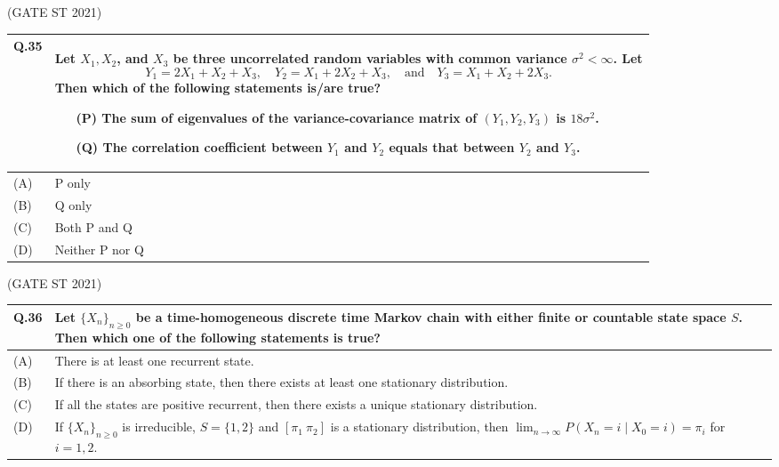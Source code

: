 \documentclass[journal,12pt,onecolumn]{IEEEtran}
\theoremstyle{remark}
\begin{document}
\bigskip
\hfill (GATE ST 2021)
\\
\begin{tabular}{|p{1cm}|p{14cm}|}
\hline
\textbf{Q.35} &
Let $X_1, X_2$, and $X_3$ be three uncorrelated random variables with common variance $\sigma^2 < \infty$. Let
$$
Y_1 = 2X_1 + X_2 + X_3, \quad Y_2 = X_1 + 2X_2 + X_3, \quad \text{and} \quad Y_3 = X_1 + X_2 + 2X_3.
$$
Then which of the following statements is/are true?

\begin{itemize}
\item[(P)] The sum of eigenvalues of the variance-covariance matrix of $(Y_1, Y_2, Y_3)$ is $18 \sigma^2$.
\item[(Q)] The correlation coefficient between $Y_1$ and $Y_2$ equals that between $Y_2$ and $Y_3$.
\end{itemize}\\
\hline

(A) & P only\\
\hline
(B) & Q only\\
\hline
(C) & Both P and Q\\
\hline
(D) & Neither P nor Q\\
\hline
\end{tabular}

\bigskip
\hfill (GATE ST 2021)
\\
\begin{tabular}{|p{1cm}|p{14cm}|}
\hline
\textbf{Q.36} &
Let $\{X_n\}_{n \geq 0}$ be a time-homogeneous discrete time Markov chain with either finite or countable state space $S$. Then which one of the following statements is true?\\
\hline

(A) & There is at least one recurrent state.\\
\hline
(B) & If there is an absorbing state, then there exists at least one stationary distribution.\\
\hline
(C) & If all the states are positive recurrent, then there exists a unique stationary distribution.\\
\hline
(D) & If $\{X_n\}_{n \geq 0}$ is irreducible, $S = \{1,2\}$ and $[\pi_1 \ \pi_2]$ is a stationary distribution, then $\lim_{n \to \infty} P(X_n = i \mid X_0 = i) = \pi_i$ for $i=1,2$.\\
\hline
\end{tabular}
\end{document}
